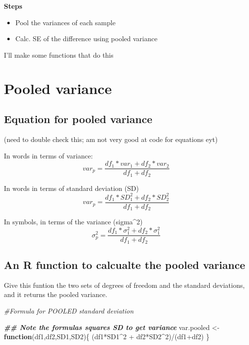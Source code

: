 \documentclass[
]{book}
\newenvironment{Shaded}{\begin{snugshade}}{\end{snugshade}}
\newcommand{\CommentTok}[1]{\textcolor[rgb]{0.56,0.35,0.01}{\textit{#1}}}
\newcommand{\ControlFlowTok}[1]{\textcolor[rgb]{0.13,0.29,0.53}{\textbf{#1}}}
\newcommand{\DecValTok}[1]{\textcolor[rgb]{0.00,0.00,0.81}{#1}}
\newcommand{\DocumentationTok}[1]{\textcolor[rgb]{0.56,0.35,0.01}{\textbf{\textit{#1}}}}
\newcommand{\NormalTok}[1]{#1}
\newcommand{\OtherTok}[1]{\textcolor[rgb]{0.56,0.35,0.01}{#1}}
\newcommand{\SpecialCharTok}[1]{\textcolor[rgb]{0.00,0.00,0.00}{#1}}
\providecommand{\tightlist}{%
  \setlength{\itemsep}{0pt}\setlength{\parskip}{0pt}}
\begin{document}
\textbf{Steps}

\begin{itemize}
\tightlist
\item
  Pool the variances of each sample
\item
  Calc. SE of the difference using pooled variance
\end{itemize}

I'll make some functions that do this

\hypertarget{pooled-variance}{%
\section{Pooled variance}\label{pooled-variance}}

\hypertarget{equation-for-pooled-variance}{%
\subsection{Equation for pooled variance}\label{equation-for-pooled-variance}}

(need to double check this; am not very good at code for equations eyt)

In words in terms of variance:
\[var_p = {\frac{df_1*var_1 + df_2*var_2}{df_1 + df_2}}\]

In words in terms of standard deviation (SD)
\[var_p = {\frac{df_1*SD^2_1 + df_2*SD^2_2}{df_1 + df_2}}\]

In symbols, in terms of the variance (sigma\^{}2)
\[\sigma^2_p = {\frac{df_1*\sigma^2_1 + df_2*\sigma^2_1}{df_1 + df_2}}\]

\hypertarget{an-r-function-to-calcualte-the-pooled-variance}{%
\subsection{An R function to calcualte the pooled variance}\label{an-r-function-to-calcualte-the-pooled-variance}}

Give this funtion the two sets of degrees of freedom and the standard deviations, and it returns the pooled variance.

\begin{Shaded}
\begin{Highlighting}[]
\CommentTok{\#Formula for POOLED standard deviation}

\DocumentationTok{\#\# Note the formulas squares SD to get variance}
\NormalTok{var.pooled }\OtherTok{\textless{}{-}} \ControlFlowTok{function}\NormalTok{(df1,df2,SD1,SD2)\{}
\NormalTok{  (df1}\SpecialCharTok{*}\NormalTok{SD1}\SpecialCharTok{\^{}}\DecValTok{2} \SpecialCharTok{+}\NormalTok{ df2}\SpecialCharTok{*}\NormalTok{SD2}\SpecialCharTok{\^{}}\DecValTok{2}\NormalTok{)}\SpecialCharTok{/}\NormalTok{(df1}\SpecialCharTok{+}\NormalTok{df2)}
\NormalTok{\}}
\end{Highlighting}
\end{Shaded}
\end{document}
